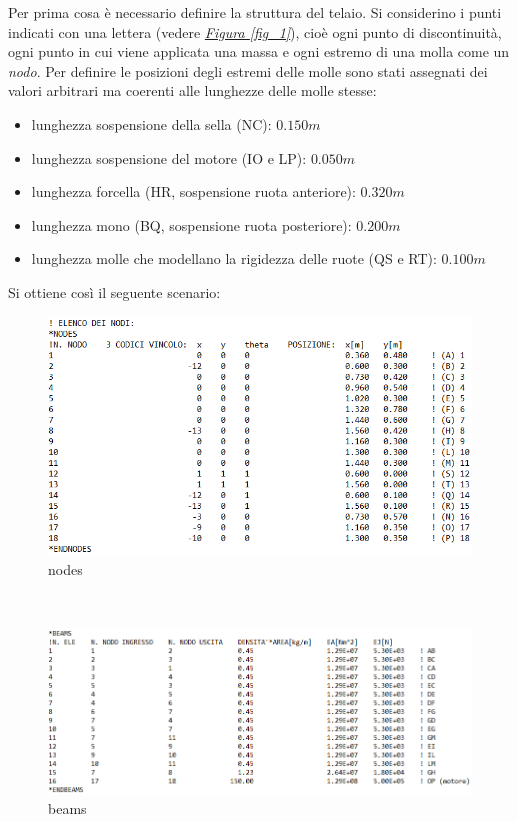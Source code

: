 \documentclass[12pt, a4paper]{article}
\begin{document}
	Per prima cosa è necessario definire la struttura del telaio. Si considerino i punti indicati con una lettera (vedere \textit{\underline{Figura \ref{fig_1}}}), cioè ogni punto di discontinuità, ogni punto in cui viene applicata una massa e ogni estremo di una molla come un \textit{nodo}. Per definire le posizioni degli estremi delle molle sono stati assegnati dei valori arbitrari ma coerenti alle lunghezze delle molle stesse:
	\begin{itemize}
		\item lunghezza sospensione della sella (NC): $0.150m$
		\item lunghezza sospensione del motore (IO e LP): $0.050m$
		\item lunghezza forcella (HR, sospensione ruota anteriore): $0.320m$
		\item lunghezza mono (BQ, sospensione ruota posteriore): $0.200m$
		\item lunghezza molle che modellano la rigidezza delle ruote (QS e RT): $0.100m$ 
	\end{itemize}
	Si ottiene così il seguente scenario:
	\begin{figure}[h]
		\centering
		\includegraphics[scale=0.7]{Nodes}
		\caption{nodes}
	\end{figure}\\    
	\begin{figure}[h]
		\centering
		\includegraphics[scale=0.7]{Beams}
		\caption{beams}	
	\end{figure}\\
\end{document}
